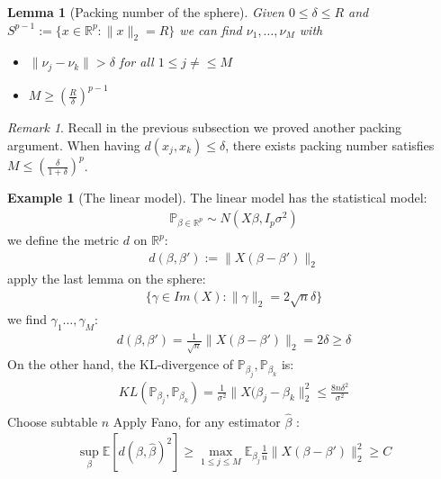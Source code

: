 \documentclass[a4paper,12pt, oneside, fleqn]{book}
\newtheorem{lemma}[theorem]{Lemma}
\theoremstyle{definition}
\newtheorem*{example}{Example}
\theoremstyle{remark}
\newtheorem*{remark}{Remark}
\begin{document}
\begin{lemma}[Packing number of the sphere]
Given $0 \le \delta \le R$ and $S^{p-1} := \{ x \in \mathbb{R}^p: \|x\|_2 = R\}$ we can find $\nu_1, \dots, \nu_M$ with
\begin{itemize}
	\item $\|\nu_j - \nu_k\| > \delta$ for all $1 \le j \neq \le M$
	\item $M \geq (\frac{R}{\delta})^{p-1}$
\end{itemize}
\end{lemma}
\begin{remark}
Recall in the previous subsection we proved another packing argument. When having $d(x_j, x_k) \le \delta$, there exists packing number satisfies $M \le (\frac{\delta}{1+ \delta})^p$.	
\end{remark}


\begin{example}[The linear model]
	The linear model has the statistical model:
	\begin{align*}
		\mathbb{P}_{\beta \in \mathbb{R}^p} \sim N(X\beta, I_p \sigma^2)
	\end{align*}
	we define the metric $d$ on $\mathbb{R}^p$:
	\begin{align*}
		d(\beta, \beta'):= \|X(\beta - \beta')\|_2
	\end{align*}
	apply the last lemma on the sphere:
	\begin{align*}
		\{\gamma \in Im(X): \|\gamma\|_2 = 2 \sqrt{n} \delta\}
	\end{align*}
	we find $\gamma_1 \dots, \gamma_M$:
	\begin{align*}
		d(\beta, \beta') = \frac{1}{\sqrt{n}}\|X(\beta - \beta')\|_2 = 2 \delta \ge \delta
	\end{align*}
	On the other hand, the KL-divergence of $\mathbb{P}_{\beta_j}, \mathbb{P}_{\beta_k}$ is:
	\begin{align*}
		KL(\mathbb{P}_{\beta_j}, \mathbb{P}_{\beta_k}) = \frac{1}{\sigma^2}\|X(\beta_j - \beta_k\|^2_2 \le \frac{8n\delta^2}{\sigma^2} \\
	\end{align*}
	Choose subtable $n$ Apply Fano, for any estimator $\hat{\beta}$ :
	\begin{align*}
		\sup_\beta\mathbb{E}[d(\beta , \hat{\beta})^2 ] \ge \max_{1 \le j \le M} \mathbb{E}_{\beta_j} \frac{1}{n}\|X(\beta - \beta')\|_2^2 \ge C 
	\end{align*}
\end{example}
\end{document}
